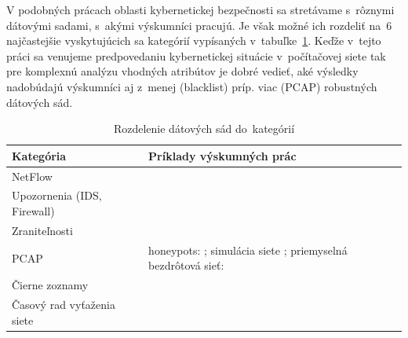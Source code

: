 \documentclass[thesismargins, thesislinespacing, openright, upjsfrontpage]{rnthesis}
\begin{document}

V podobných prácach oblasti kybernetickej bezpečnosti sa stretávame s~rôznymi dátovými sadami, s~akými výskumníci pracujú. Je však možné ich rozdeliť na~6 najčastejšie vyskytujúcich sa kategórií vypísaných v~tabuľke~\ref{tab:c1_datasets}. Keďže v~tejto práci sa venujeme predpovedaniu kybernetickej situácie v~počítačovej siete tak pre komplexnú analýzu vhodných atribútov je dobré vedieť, aké výsledky nadobúdajú výskumníci aj z~menej (blacklist) príp. viac (PCAP) robustných dátových sád.

\begin{table}[]
    \centering
    \begin{tabular}{ | p{5cm} | p{9cm} | }
         \hline \textbf{Kategória} & \textbf{Príklady výskumných prác} \\
         \hline
         \hline NetFlow & \cite{zang2019adaptive,fang2019deep,millar2019using,bakhshi2015user,jakalan2015profiling,marchette1999statistical,bernaille2006traffic,jirsik2020cyber} \\
         \hline Upozornenia \newline (IDS, Firewall) & \cite{granat2019big,werner2017time,shin2013advanced,ramaki2015real,soldo2011blacklisting} \\
         \hline Zraniteľnosti & \cite{tang2016exploiting,condon2008analysis,roumani2015time,tang2018disclosure,tang2017big,pokhrel2017cybersecurity} \\
         \hline PCAP & honeypots: \cite{zhan2015predicting,berti2017profiling,hammerschmidt2016efficient}; \newline simulácia siete \cite{jiang2004detecting}; \newline priemyselná bezdrôtová sieť: \cite{wei2012intrusion}  \\
         \hline Čierne zoznamy & \cite{liu2015cloudy} \\
         \hline Časový rad vyťaženia siete & \cite{cortez2012multi,hasegawa2001applications,papagiannaki2005long,sang2002predictability,wang2008internet} \\
         \hline
    \end{tabular}
    \caption{Rozdelenie dátových sád do~kategórií}
    \label{tab:c1_datasets}
\end{table}
\end{document}

